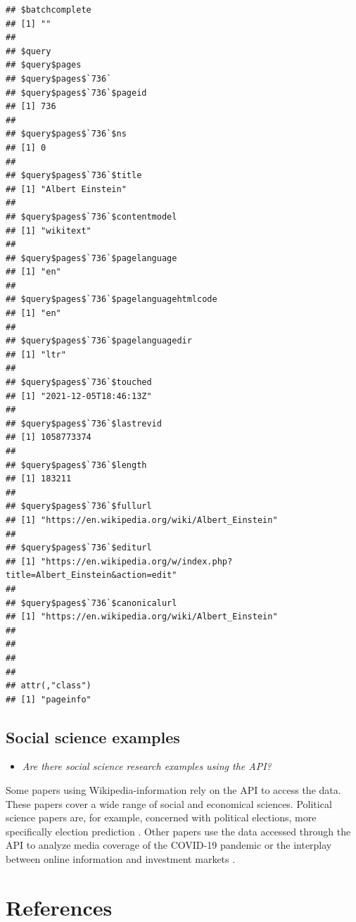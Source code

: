 \documentclass[
]{book}
\providecommand{\tightlist}{%
  \setlength{\itemsep}{0pt}\setlength{\parskip}{0pt}}
\begin{document}
\begin{verbatim}
## $batchcomplete
## [1] ""
## 
## $query
## $query$pages
## $query$pages$`736`
## $query$pages$`736`$pageid
## [1] 736
## 
## $query$pages$`736`$ns
## [1] 0
## 
## $query$pages$`736`$title
## [1] "Albert Einstein"
## 
## $query$pages$`736`$contentmodel
## [1] "wikitext"
## 
## $query$pages$`736`$pagelanguage
## [1] "en"
## 
## $query$pages$`736`$pagelanguagehtmlcode
## [1] "en"
## 
## $query$pages$`736`$pagelanguagedir
## [1] "ltr"
## 
## $query$pages$`736`$touched
## [1] "2021-12-05T18:46:13Z"
## 
## $query$pages$`736`$lastrevid
## [1] 1058773374
## 
## $query$pages$`736`$length
## [1] 183211
## 
## $query$pages$`736`$fullurl
## [1] "https://en.wikipedia.org/wiki/Albert_Einstein"
## 
## $query$pages$`736`$editurl
## [1] "https://en.wikipedia.org/w/index.php?title=Albert_Einstein&action=edit"
## 
## $query$pages$`736`$canonicalurl
## [1] "https://en.wikipedia.org/wiki/Albert_Einstein"
## 
## 
## 
## 
## attr(,"class")
## [1] "pageinfo"
\end{verbatim}

\hypertarget{social-science-examples-9}{%
\section{Social science examples}\label{social-science-examples-9}}

\begin{itemize}
\tightlist
\item
  \emph{Are there social science research examples using the API?}
\end{itemize}

Some papers using Wikipedia-information rely on the API to access the data. These papers cover a wide range of social and economical sciences. Political science papers are, for example, concerned with political elections, more specifically election prediction \citep{margolin2016wiki, salem2021wikipedia}. Other papers use the data accessed through the API to analyze media coverage of the COVID-19 pandemic \citep{gozzi2020collective} or the interplay between online information and investment markets \citep{elbahrawy2019wikipedia}.

\hypertarget{references}{%
\chapter{References}\label{references}}
\end{document}
